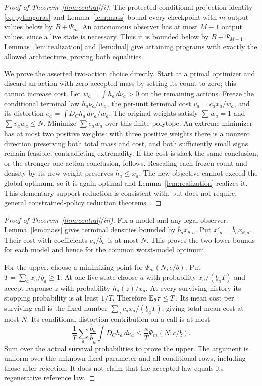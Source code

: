 \begin{proof}[Proof of Theorem~\ref{thm:central}\textup{(i)}]
The protected conditional projection identity \eqref{eq:pythagoras} and Lemma~\ref{lem:mass} bound every checkpoint with $m$ output values below by $B+\Psi_m$. An autonomous observer has at most $M-1$ output values, since a live state is necessary. Thus it is bounded below by $B+\Psi_{M-1}$. Lemmas~\ref{lem:realization} and \ref{lem:dual} give attaining programs with exactly the allowed architecture, proving both equalities.

We prove the asserted two-action choice directly. Start at a primal optimizer and discard an action with zero accepted mass by setting its count to zero; this cannot increase cost. Let $w_a=\int h_a\,d\nu_a>0$ on the remaining actions. Freeze the conditional terminal law $h_a\nu_a/w_a$, the per-unit terminal cost $v_a=c_ax_a/w_a$, and its distortion $e_a=\int D_Ch_a\,d\nu_a/w_a$. The original weights satisfy $\sum w_a=1$ and $\sum v_aw_a\le N$. Minimize $\sum e_aw_a$ over this finite polytope. An extreme minimizer has at most two positive weights: with three positive weights there is a nonzero direction preserving both total mass and cost, and both sufficiently small signs remain feasible, contradicting extremality. If the cost is slack the same conclusion, or the stronger one-action conclusion, follows. Rescaling each frozen count and density by its new weight preserves $h_a\le x_a$. The new objective cannot exceed the global optimum, so it is again optimal and Lemma~\ref{lem:realization} realizes it. This elementary support reduction is consistent with, but does not require, general constrained-policy reduction theorems~\cite{DPRchat}.
\end{proof}

\begin{proof}[Proof of Theorem~\ref{thm:central}\textup{(iii)}]
Fix a model and any legal observer. Lemma~\ref{lem:mass} gives terminal densities bounded by $\overline b_a x_{\theta,a}$. Put $x'_a=\overline b_a x_{\theta,a}$. Their cost with coefficients $c_a/\overline b_a$ is at most $N$. This proves the two lower bounds for each model and hence for the common worst-model optimum.

For the upper, choose a minimizing point for $\Psi_m(N;c/\underline b)$. Put $T=\sum_a x_a/\underline b_a\ge1$. At one live state choose $a$ with probability $x_a/(\underline b_aT)$ and accept response $z$ with probability $h_a(z)/x_a$. At every surviving history its stopping probability is at least $1/T$. Therefore $\mathbb E_\theta\tau\le T$. Its mean cost per surviving call is the fixed number $\sum_a c_ax_a/(\underline b_aT)$, giving total mean cost at most $N$. Its conditional distortion contribution on a call is at most
\[
 \frac1T\sum_a\frac{\overline b_a}{\underline b_a}
                 \int D_Ch_a\,d\nu_a
 \le\frac\kappa T\Psi_m(N;c/\underline b).
\]
Sum over the actual survival probabilities to prove the upper. The argument is uniform over the unknown fixed parameter and all conditional rows, including those after rejection. It does not claim that the accepted law equals its regenerative reference law.
\end{proof}

